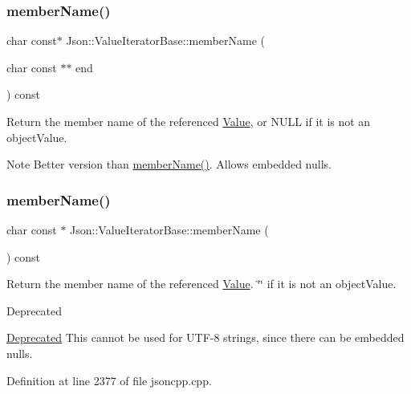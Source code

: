 \subsubsection{\texorpdfstring{member\+Name()}{memberName()}\hspace{0.1cm}{\footnotesize\ttfamily [2/4]}}
{\footnotesize\ttfamily char const$\ast$ Json\+::\+Value\+Iterator\+Base\+::member\+Name (\begin{DoxyParamCaption}\item[{char const $\ast$$\ast$}]{end }\end{DoxyParamCaption}) const}

Return the member name of the referenced \hyperlink{class_json_1_1_value}{Value}, or N\+U\+LL if it is not an object\+Value. \begin{DoxyNote}{Note}
Better version than \hyperlink{class_json_1_1_value_iterator_base_a54765da6759fd3f1edcbfbaf308ec263}{member\+Name()}. Allows embedded nulls. 
\end{DoxyNote}
\hypertarget{class_json_1_1_value_iterator_base_a54765da6759fd3f1edcbfbaf308ec263}{}\label{class_json_1_1_value_iterator_base_a54765da6759fd3f1edcbfbaf308ec263} 
\subsubsection{\texorpdfstring{member\+Name()}{memberName()}\hspace{0.1cm}{\footnotesize\ttfamily [3/4]}}
{\footnotesize\ttfamily char const  $\ast$ Json\+::\+Value\+Iterator\+Base\+::member\+Name (\begin{DoxyParamCaption}{ }\end{DoxyParamCaption}) const}

Return the member name of the referenced \hyperlink{class_json_1_1_value}{Value}. \char`\"{}\char`\"{} if it is not an object\+Value. \begin{DoxyRefDesc}{Deprecated}
\item[\hyperlink{deprecated__deprecated000004}{Deprecated}]This cannot be used for U\+T\+F-\/8 strings, since there can be embedded nulls. \end{DoxyRefDesc}


Definition at line 2377 of file jsoncpp.\+cpp.

\hypertarget{class_json_1_1_value_iterator_base_a391c9cbd0edf9a447b37df00e8ce6059}{}\label{class_json_1_1_value_iterator_base_a391c9cbd0edf9a447b37df00e8ce6059} 
